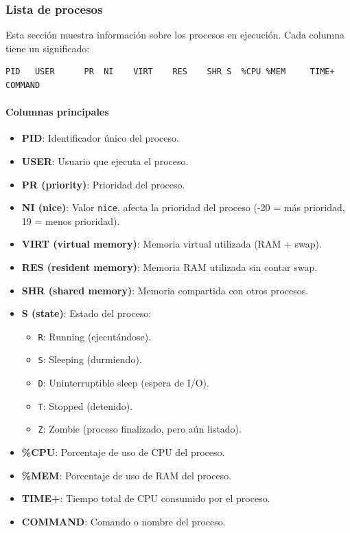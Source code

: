 \subsubsection*{Lista de procesos}

Esta sección muestra información sobre los procesos en ejecución. Cada columna tiene un significado:

\begin{verbatim}
PID   USER      PR  NI    VIRT    RES    SHR S  %CPU %MEM     TIME+ COMMAND
\end{verbatim}

\paragraph{Columnas principales}
\begin{itemize}
  \item \textbf{PID}: Identificador único del proceso.
  \item \textbf{USER}: Usuario que ejecuta el proceso.
  \item \textbf{PR (priority)}: Prioridad del proceso.
  \item \textbf{NI (nice)}: Valor \texttt{nice}, afecta la prioridad del proceso (-20 = más prioridad, 19 = menos prioridad).
  \item \textbf{VIRT (virtual memory)}: Memoria virtual utilizada (RAM + swap).
  \item \textbf{RES (resident memory)}: Memoria RAM utilizada sin contar swap.
  \item \textbf{SHR (shared memory)}: Memoria compartida con otros procesos.
  \item \textbf{S (state)}: Estado del proceso:
  \begin{itemize}
    \item \texttt{R}: Running (ejecutándose).
    \item \texttt{S}: Sleeping (durmiendo).
    \item \texttt{D}: Uninterruptible sleep (espera de I/O).
    \item \texttt{T}: Stopped (detenido).
    \item \texttt{Z}: Zombie (proceso finalizado, pero aún listado).
  \end{itemize}
  \item \textbf{\%CPU}: Porcentaje de uso de CPU del proceso.
  \item \textbf{\%MEM}: Porcentaje de uso de RAM del proceso.
  \item \textbf{TIME+}: Tiempo total de CPU consumido por el proceso.
  \item \textbf{COMMAND}: Comando o nombre del proceso.
\end{itemize}

